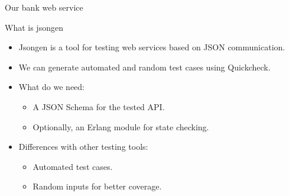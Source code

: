 \begin{frame}{Our bank web service}
  \begin{figure}
    \centering
    \begin{overprint}[\textwidth]
  \end{overprint}
  \end{figure}
\end{frame}

\begin{frame}{What is jsongen}

  \begin{itemize}
  \item Jsongen is a tool for testing web services based on JSON
    communication.

  \item We can generate automated and random test cases using
    Quickcheck.

  \item What do we need:
    \begin{itemize}
    \item A JSON Schema for the tested API.
    \item Optionally, an Erlang module for state checking.
    \end{itemize}

  \item Differences with other testing tools:
    \begin{itemize}
    \item Automated test cases.
    \item Random inputs for better coverage.
    \end{itemize}

  \end{itemize}

\end{frame}